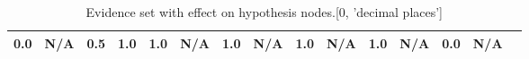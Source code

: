 \begin{table}
\begin{tabular}{c|cc|cc|cc|cc|cc|cc|cc}
\cellcolor{Bittersweet}0.0&\cellcolor{Bittersweet}N/A&\cellcolor{Bittersweet}0.5&\cellcolor{Bittersweet}1.0&\cellcolor{Bittersweet}1.0&\cellcolor{Bittersweet}N/A&\cellcolor{Bittersweet}1.0&\cellcolor{Bittersweet}N/A&\cellcolor{Bittersweet}1.0&\cellcolor{Bittersweet}N/A&\cellcolor{Bittersweet}1.0&\cellcolor{Bittersweet}N/A&\cellcolor{Bittersweet}0.0&\cellcolor{Bittersweet}N/A\\\bottomrule\end{tabular}\caption{Evidence set with effect on hypothesis nodes.[0, 'decimal places']}\end{table}
